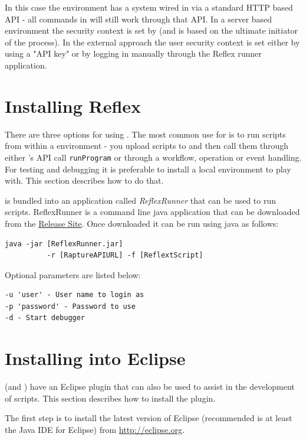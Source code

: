 In this case the environment has a \Rapture system wired in via a standard HTTP based API - all \Rapture commands in \Reflex will still work through that API. In a server based environment the security context is set by \Rapture (and is based on the ultimate initiator of the \Reflex process). In the external approach the user security context is set either by using a \Rapture "API key" or by logging in manually through the Reflex runner application.

\section{Installing Reflex}
There are three options for using \Reflex. The most common use for \Reflex is to run scripts from within a \Rapture environment - you upload scripts to \Rapture and then call them through either \Rapture's API call \verb+runProgram+ or through a \Rapture workflow, operation or event handling. For testing and debugging it is preferable to install a local environment to play with. This section describes how to do that.

\Reflex is bundled into an application called \emph{ReflexRunner} that can be used to run \Reflex scripts. ReflexRunner is a command line java application that can be downloaded from the \href{http://incapture.github.com/RaptureRepo/release}{\Rapture Release Site}. Once downloaded it can be run using java as follows:

\begin{verbatim}
java -jar [ReflexRunner.jar] 
          -r [RaptureAPIURL] -f [ReflextScript]
\end{verbatim}

Optional parameters are listed below:

\begin{verbatim}
-u 'user' - User name to login as
-p 'password' - Password to use
-d - Start debugger
\end{verbatim}

\section{Installing into Eclipse}
\Reflex (and \Rapture) have an Eclipse plugin that can also be used to assist in the development of \Reflex scripts. This section describes how to install the plugin.

The first step is to install the latest version of Eclipse (recommended is at least the Java IDE for Eclipse) from \url{http://eclipse.org}.

